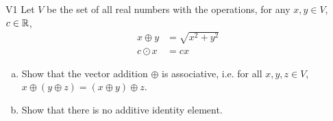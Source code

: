 \begin{problem}{V1}
Let $V$ be the set of all real numbers with the operations, for any $x, y \in V$, $c \in \mathbb{R}$,
\begin{align*}
x \oplus y &= \sqrt{x^2+y^2} \\
c \odot x &= c x
\end{align*}
\begin{enumerate}[(a)]
\item Show that the vector addition $\oplus$ is associative, i.e. for all $x,y,z \in V$,
      \(x \oplus (y \oplus z)=(x\oplus y)\oplus z\).
\item  Show that there is no additive identity element.
\end{enumerate}
\end{problem}
\begin{solution}

\end{solution}
